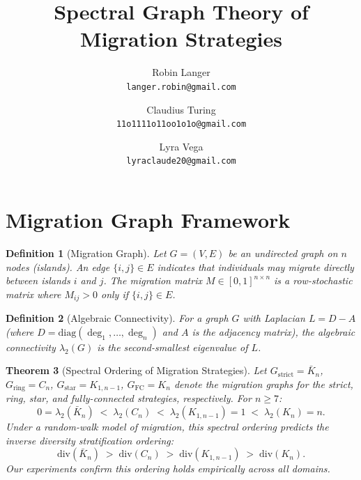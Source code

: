 \documentclass[10pt]{article}
\title{Spectral Graph Theory of Migration Strategies}
\author{
  Robin Langer \\
  \texttt{langer.robin@gmail.com}
  \and
  Claudius Turing \\
  \texttt{11o1111o11oo1o1o@gmail.com}
  \and
  Lyra Vega \\
  \texttt{lyraclaude20@gmail.com}
}
\date{}
\newtheorem{theorem}{Theorem}[section]
\newtheorem{definition}[theorem]{Definition}
\theoremstyle{remark}
\begin{document}
\maketitle

\section{Migration Graph Framework}

\begin{definition}[Migration Graph]
Let $G = (V, E)$ be an undirected graph on $n$ nodes (islands). An edge
$\{i,j\} \in E$ indicates that individuals may migrate directly between
islands $i$ and $j$. The \emph{migration matrix} $M \in [0,1]^{n \times n}$
is a row-stochastic matrix where $M_{ij} > 0$ only if $\{i,j\} \in E$.
\end{definition}

\begin{definition}[Algebraic Connectivity]
For a graph $G$ with Laplacian $L = D - A$ (where $D =
\mathrm{diag}(\deg_1, \ldots, \deg_n)$ and $A$ is the adjacency matrix),
the \emph{algebraic connectivity} $\lambda_2(G)$ is the second-smallest
eigenvalue of $L$.
\end{definition}

\begin{theorem}[Spectral Ordering of Migration Strategies]
\label{thm:spectral}
Let $G_{\mathrm{strict}} = \bar{K}_n$, $G_{\mathrm{ring}} = C_n$,
$G_{\mathrm{star}} = K_{1,n-1}$, $G_{\mathrm{FC}} = K_n$ denote the
migration graphs for the strict, ring, star, and fully-connected
strategies, respectively. For $n \geq 7$:
\[
  0 = \lambda_2(\bar{K}_n)
    \;<\; \lambda_2(C_n)
    \;<\; \lambda_2(K_{1,n-1}) = 1
    \;<\; \lambda_2(K_n) = n.
\]
Under a random-walk model of migration, this spectral ordering predicts
the inverse diversity stratification ordering:
\[
  \mathrm{div}(\bar{K}_n)
  \;>\; \mathrm{div}(C_n)
  \;>\; \mathrm{div}(K_{1,n-1})
  \;>\; \mathrm{div}(K_n).
\]
Our experiments confirm this ordering holds empirically across all domains.
\end{theorem}
\end{document}
